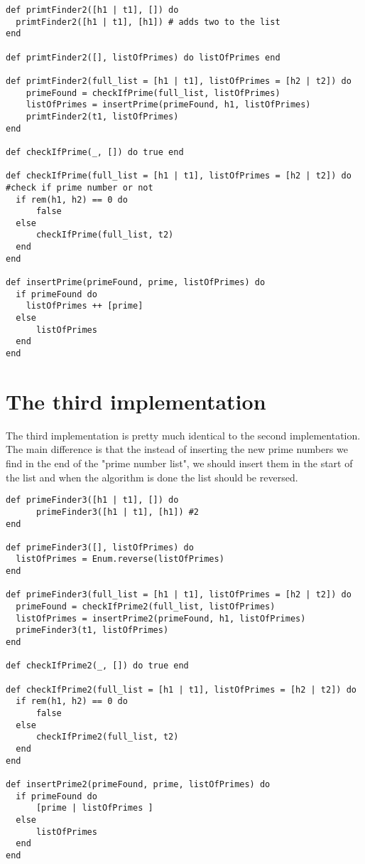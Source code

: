 \documentclass[a4paper,11pt]{article}
\begin{document}
\begin{verbatim}
def primtFinder2([h1 | t1], []) do
  primtFinder2([h1 | t1], [h1]) # adds two to the list
end

def primtFinder2([], listOfPrimes) do listOfPrimes end

def primtFinder2(full_list = [h1 | t1], listOfPrimes = [h2 | t2]) do
    primeFound = checkIfPrime(full_list, listOfPrimes)
    listOfPrimes = insertPrime(primeFound, h1, listOfPrimes)
    primtFinder2(t1, listOfPrimes)
end

def checkIfPrime(_, []) do true end

def checkIfPrime(full_list = [h1 | t1], listOfPrimes = [h2 | t2]) do #check if prime number or not
  if rem(h1, h2) == 0 do
      false
  else
      checkIfPrime(full_list, t2)
  end
end

def insertPrime(primeFound, prime, listOfPrimes) do
  if primeFound do
    listOfPrimes ++ [prime]
  else
      listOfPrimes
  end
end
\end{verbatim}

\section{The third implementation}
The third implementation is pretty much identical to the second implementation. The main difference is that the instead of inserting the new prime numbers we find in the end of the "prime number list", we should insert them in the start of the list and when the algorithm is done the list should be reversed.

\begin{verbatim}
def primeFinder3([h1 | t1], []) do
      primeFinder3([h1 | t1], [h1]) #2
end

def primeFinder3([], listOfPrimes) do
  listOfPrimes = Enum.reverse(listOfPrimes)
end

def primeFinder3(full_list = [h1 | t1], listOfPrimes = [h2 | t2]) do
  primeFound = checkIfPrime2(full_list, listOfPrimes)
  listOfPrimes = insertPrime2(primeFound, h1, listOfPrimes)
  primeFinder3(t1, listOfPrimes)
end

def checkIfPrime2(_, []) do true end

def checkIfPrime2(full_list = [h1 | t1], listOfPrimes = [h2 | t2]) do
  if rem(h1, h2) == 0 do
      false
  else
      checkIfPrime2(full_list, t2)
  end
end

def insertPrime2(primeFound, prime, listOfPrimes) do
  if primeFound do
      [prime | listOfPrimes ]
  else
      listOfPrimes
  end
end
\end{verbatim}
\end{document}
